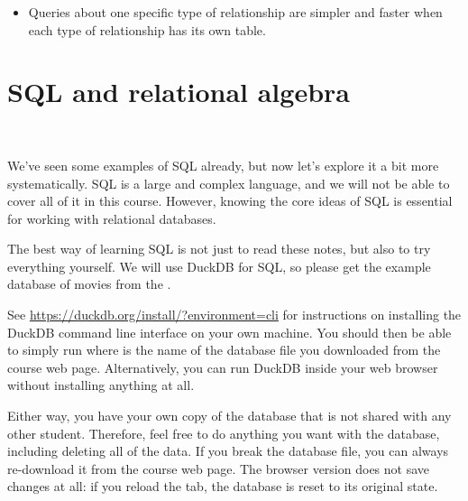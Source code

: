 {\begin{itemize}
            This can be addressed by defining the column to be an enum type, which allows it to take only one of a set of specified values, or by defining a  table and making  a foreign key into that table.
        \item Queries about one specific type of relationship are simpler and faster when each type of relationship has its own table.
    \end{itemize}
}


\section{SQL and relational algebra}\label{sec:sql}

\begin{frame}
    \begin{center}
        {\Large{\color{darkblue}{SQL and relational algebra}}} \\[2em]
        \mydetails
    \end{center}
\end{frame}

We've seen some examples of SQL already, but now let's explore it a bit more systematically.
SQL is a large and complex language, and we will not be able to cover all of it in this course.
However, knowing the core ideas of SQL is essential for working with relational databases.

The best way of learning SQL is not just to read these notes, but also to try everything yourself.
We will use DuckDB for SQL, so please get the example database of movies from the \materialspage{}.

See \url{https://duckdb.org/install/?environment=cli} for instructions on installing the DuckDB command line interface on your own machine.
You should then be able to simply run  where  is the name of the database file you downloaded from the course web page.
Alternatively, you can run DuckDB inside your web browser without installing anything at all.

Either way, you have your own copy of the database that is not shared with any other student.
Therefore, feel free to do anything you want with the database, including deleting all of the data.
If you break the database file, you can always re-download it from the course web page.
The browser version does not save changes at all: if you reload the tab, the database is reset to its original state.


